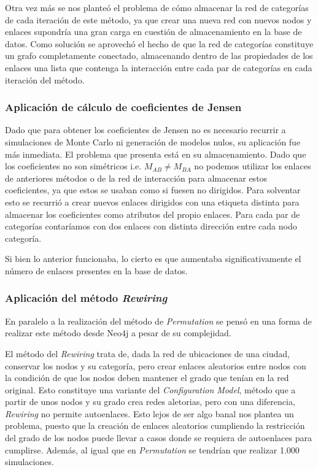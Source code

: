 Otra vez más se nos planteó el problema de cómo almacenar la red de categorías de cada iteración de este método, ya que crear una nueva red con nuevos nodos y enlaces supondría una gran carga en cuestión de almacenamiento en la base de datos. Como solución se aprovechó el hecho de que la red de categorías constituye un grafo completamente conectado, almacenando dentro de las propiedades de los enlaces una lista que contenga la interacción entre cada par de categorías en cada iteración del método.



\subsubsection{Aplicación de cálculo de coeficientes de Jensen}

Dado que para obtener los coeficientes de Jensen no es necesario recurrir a simulaciones de Monte Carlo ni generación de modelos nulos, su aplicación fue más inmediata. El problema que presenta está en su almacenamiento. Dado que los coeficientes no son simétricos i.e. $M_{AB}\neq M_{BA}$ no podemos utilizar los enlaces de anteriores métodos o de la red de interacción para almacenar estos coeficientes, ya que estos se usaban como si fuesen no dirigidos. Para solventar esto se recurrió a crear nuevos enlaces dirigidos con una etiqueta distinta para almacenar los coeficientes como atributos del propio enlaces. Para cada par de categorías contaríamos con dos enlaces con distinta dirección entre cada nodo categoría.

Si bien lo anterior funcionaba, lo cierto es que aumentaba significativamente el número de enlaces presentes en la base de datos.


\subsubsection{Aplicación del método \textit{Rewiring}}
En paralelo a la realización del método de \textit{Permutation} se pensó en una forma de realizar este método desde Neo4j a pesar de su complejidad.

El método del \textit{Rewiring} trata de, dada la red de ubicaciones de una ciudad, conservar los nodos y su categoría, pero crear enlaces aleatorios entre nodos con la condición de que los nodos deben mantener el grado que tenían en la red original. Esto constituye una variante del \textit{Configuration Model}, método que a partir de unos nodos y su grado crea redes aletorias, pero con una diferencia, \textit{Rewiring} no permite autoenlaces. Esto lejos de ser algo banal nos plantea un problema, puesto que la creación de enlaces aleatorios cumpliendo la restricción del grado de los nodos puede llevar a casos donde se requiera de autoenlaces para cumplirse. Además, al igual que en \textit{Permutation} se tendrían que realizar 1.000 simulaciones.

